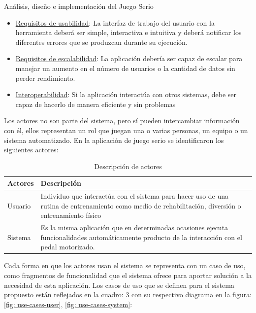 \begin{thesischapter}{2} {Análisis, diseño e implementación del Juego Serio}
    \begin{itemize}
        \item \underline{Requisitos de usabilidad}: La interfaz de trabajo del usuario con la herramienta deberá ser simple, interactiva e intuitiva y deberá notificar los diferentes errores que se produzcan durante su ejecución.
        \item \underline{Requisitos de escalabilidad}: La aplicación debería ser capaz de escalar para manejar un aumento en el número de usuarios o la cantidad de datos sin perder rendimiento.     
        \item \underline{Interoperabilidad}: Si la aplicación interactúa con otros sistemas, debe ser capaz de hacerlo de manera eficiente y sin problemas 
    \end{itemize}

    \newpage
    Los actores no son parte del sistema, pero sí pueden intercambiar información con él, ellos representan un rol que juegan una o varias personas, un equipo o un sistema automatizado. En la aplicación
    de juego serio se identificaron los siguientes actores:

    \begin{table}[ht]
        \centering
        \begin{tabularx}{\textwidth}{|l|X|}
            \hline
            \textbf{Actores} & \textbf{Descripción} \\\hline
            Usuario & Individuo que interactúa con el sistema para hacer uso de una rutina de entrenamiento
            como medio de rehabilitación, diversión o entrenamiento físico \\\hline
            Sistema & Es la misma aplicación que en determinadas ocasiones ejecuta funcionalidades automáticamente producto de la interacción con el pedal motorizado. \\\hline
        \end{tabularx}
        \label{tab: actores}
        \caption{Descripción de actores}
    \end{table}

    Cada forma en que los actores usan el sistema se representa con un caso de 
    uso, como fragmentos de funcionalidad que el sistema ofrece para aportar solución a la necesidad de esta aplicación. 
    Los casos de uso que se definen para el sistema propuesto están reflejados en la cuadro: 3 con su respectivo diagrama
    en la figura: \ref{fig: use-cases-user}, \ref{fig: use-cases-system}:


\end{thesischapter}
